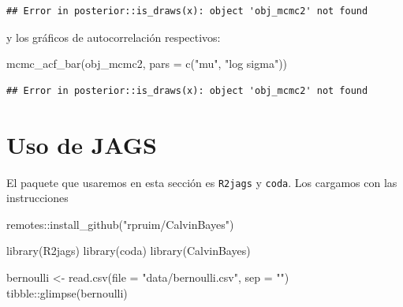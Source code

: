\documentclass[
  12pt,
]{book}
\newenvironment{Shaded}{\begin{snugshade}}{\end{snugshade}}
\newcommand{\AttributeTok}[1]{\textcolor[rgb]{0.77,0.63,0.00}{#1}}
\newcommand{\FunctionTok}[1]{\textcolor[rgb]{0.00,0.00,0.00}{#1}}
\newcommand{\NormalTok}[1]{#1}
\newcommand{\OtherTok}[1]{\textcolor[rgb]{0.56,0.35,0.01}{#1}}
\newcommand{\SpecialCharTok}[1]{\textcolor[rgb]{0.00,0.00,0.00}{#1}}
\newcommand{\StringTok}[1]{\textcolor[rgb]{0.31,0.60,0.02}{#1}}
\theoremstyle{definition}
\theoremstyle{definition}
\theoremstyle{definition}
\theoremstyle{definition}
\theoremstyle{remark}
\begin{document}
\begin{verbatim}
## Error in posterior::is_draws(x): object 'obj_mcmc2' not found
\end{verbatim}

y los gráficos de autocorrelación respectivos:

\begin{Shaded}
\begin{Highlighting}[]
\FunctionTok{mcmc\_acf\_bar}\NormalTok{(obj\_mcmc2, }\AttributeTok{pars =} \FunctionTok{c}\NormalTok{(}\StringTok{"mu"}\NormalTok{, }\StringTok{"log sigma"}\NormalTok{))}
\end{Highlighting}
\end{Shaded}

\begin{verbatim}
## Error in posterior::is_draws(x): object 'obj_mcmc2' not found
\end{verbatim}

\hypertarget{uso-de-jags}{%
\section{Uso de JAGS}\label{uso-de-jags}}

El paquete que usaremos en esta sección es \texttt{R2jags} y \texttt{coda}. Los cargamos con las instrucciones

\begin{Shaded}
\begin{Highlighting}[]
\NormalTok{remotes}\SpecialCharTok{::}\FunctionTok{install\_github}\NormalTok{(}\StringTok{"rpruim/CalvinBayes"}\NormalTok{)}
\end{Highlighting}
\end{Shaded}

\begin{Shaded}
\begin{Highlighting}[]
\FunctionTok{library}\NormalTok{(R2jags)}
\FunctionTok{library}\NormalTok{(coda)}
\FunctionTok{library}\NormalTok{(CalvinBayes)}
\end{Highlighting}
\end{Shaded}

\begin{Shaded}
\begin{Highlighting}[]
\NormalTok{bernoulli }\OtherTok{\textless{}{-}} \FunctionTok{read.csv}\NormalTok{(}\AttributeTok{file =} \StringTok{"data/bernoulli.csv"}\NormalTok{,}
    \AttributeTok{sep =} \StringTok{""}\NormalTok{)}
\NormalTok{tibble}\SpecialCharTok{::}\FunctionTok{glimpse}\NormalTok{(bernoulli)}
\end{Highlighting}
\end{Shaded}
\end{document}
